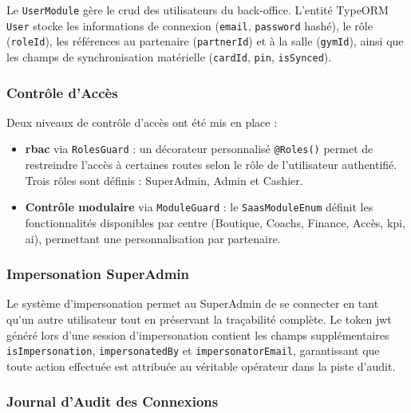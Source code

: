 ﻿\documentclass[../main.tex]{subfiles}
\begin{document}
Le \texttt{UserModule} g\`{e}re le \acrshort{crud} des utilisateurs du back-office. L'entit\'{e} TypeORM \texttt{User} stocke les informations de connexion (\texttt{email}, \texttt{password} hash\'{e}), le r\^{o}le (\texttt{roleId}), les r\'{e}f\'{e}rences au partenaire (\texttt{partnerId}) et \`{a} la salle (\texttt{gymId}), ainsi que les champs de synchronisation mat\'{e}rielle (\texttt{cardId}, \texttt{pin}, \texttt{isSynced}).

\subsubsection{Contr\^{o}le d'Acc\`{e}s}

Deux niveaux de contr\^{o}le d'acc\`{e}s ont \'{e}t\'{e} mis en place :

\begin{itemize}
  \item \textbf{\acrshort{rbac}} \cite{sandhu1996rbac} via \texttt{RolesGuard} : un d\'{e}corateur personnalis\'{e} \texttt{@Roles()} permet de restreindre l'acc\`{e}s \`{a} certaines routes selon le r\^{o}le de l'utilisateur authentifi\'{e}. Trois r\^{o}les sont d\'{e}finis : SuperAdmin, Admin et Cashier.
  \item \textbf{Contr\^{o}le modulaire} via \texttt{ModuleGuard} : le \texttt{SaasModuleEnum} d\'{e}finit les fonctionnalit\'{e}s disponibles par centre (Boutique, Coachs, Finance, Acc\`{e}s, \acrshort{kpi}, \acrshort{ai}), permettant une personnalisation par partenaire.
\end{itemize}

\subsubsection{Impersonation SuperAdmin}

Le syst\`{e}me d'impersonation permet au SuperAdmin de se connecter en tant qu'un autre utilisateur tout en pr\'{e}servant la tra\c{c}abilit\'{e} compl\`{e}te. Le token \acrshort{jwt} g\'{e}n\'{e}r\'{e} lors d'une session d'impersonation contient les champs suppl\'{e}mentaires \texttt{isImpersonation}, \texttt{impersonatedBy} et \texttt{impersonatorEmail}, garantissant que toute action effectu\'{e}e est attribu\'{e}e au v\'{e}ritable op\'{e}rateur dans la piste d'audit.

\subsubsection{Journal d'Audit des Connexions}
\end{document}
